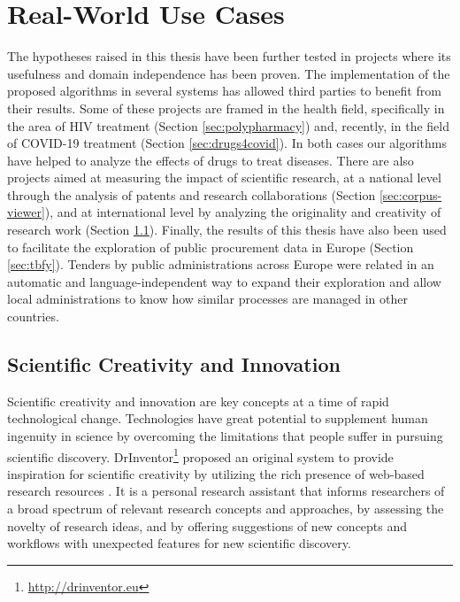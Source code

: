 

\chapter{Real-World Use Cases}\label{ch:experiments}

\graphicspath{{experiments/figures/}}


The hypotheses raised in this thesis have been further tested in projects where its usefulness and domain independence has been proven. The implementation of the proposed algorithms in several systems  has allowed third parties to benefit from their results. Some of these projects are framed in the health field, specifically in the area of HIV treatment (Section \ref{sec:polypharmacy}) and, recently, in the field of COVID-19 treatment (Section \ref{sec:drugs4covid}). In both cases our algorithms have helped to analyze the effects of drugs to treat diseases. There are also projects aimed at measuring the impact of scientific research, at a national level through the analysis of patents and research collaborations (Section \ref{sec:corpus-viewer}), and at international level by analyzing the originality and creativity of research work (Section \ref{sec:drinventor}). Finally, the results of this thesis have also been used to facilitate the exploration of public procurement data in Europe (Section \ref{sec:tbfy}). Tenders by public administrations across Europe were related in an automatic and language-independent way to expand their exploration and allow local administrations to know how similar processes are managed in other countries.  

\section{Scientific Creativity and Innovation}
\label{sec:drinventor}

Scientific creativity and innovation are key concepts at a time of rapid technological change. Technologies have great potential to supplement human ingenuity in science by overcoming the limitations that people suffer in pursuing scientific discovery. DrInventor\footnote{\url{http://drinventor.eu}} proposed an original system to provide inspiration for scientific creativity by utilizing the rich presence of web-based research resources \citep{Dong2017DrIP}. It is a personal research assistant that informs researchers of a broad spectrum of relevant research concepts and approaches, by assessing the novelty of research ideas, and by offering suggestions of new concepts and workflows with unexpected features for new scientific discovery.

